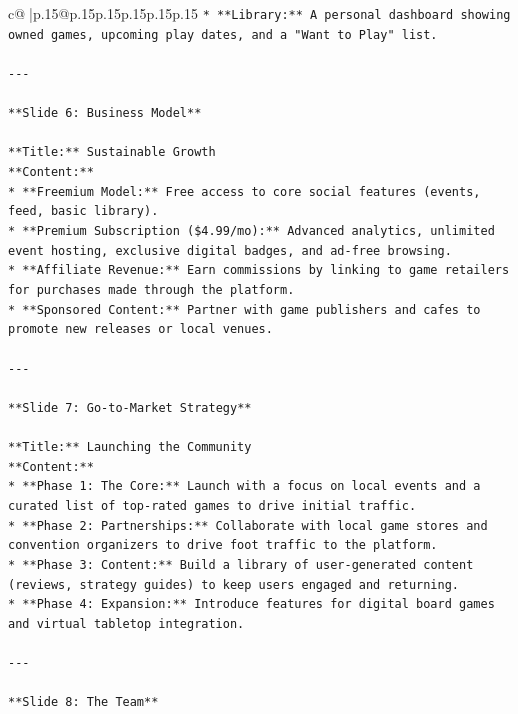 \documentclass{article}
\begin{document}
{\begin{supertabular}{c@{$\;$}|p{.15\linewidth}@{}p{.15\linewidth}p{.15\linewidth}p{.15\linewidth}p{.15\linewidth}p{.15\linewidth}}
{{{\texttt{*   **Library:** A personal dashboard showing owned games, upcoming play dates, and a "Want to Play" list.} \\
\\ 
\texttt{{-}{-}{-}} \\
\\ 
\texttt{**Slide 6: Business Model**} \\
\\ 
\texttt{**Title:** Sustainable Growth} \\
\texttt{**Content:**} \\
\texttt{*   **Freemium Model:** Free access to core social features (events, feed, basic library).} \\
\texttt{*   **Premium Subscription (\$4.99/mo):** Advanced analytics, unlimited event hosting, exclusive digital badges, and ad{-}free browsing.} \\
\texttt{*   **Affiliate Revenue:** Earn commissions by linking to game retailers for purchases made through the platform.} \\
\texttt{*   **Sponsored Content:** Partner with game publishers and cafes to promote new releases or local venues.} \\
\\ 
\texttt{{-}{-}{-}} \\
\\ 
\texttt{**Slide 7: Go{-}to{-}Market Strategy**} \\
\\ 
\texttt{**Title:** Launching the Community} \\
\texttt{**Content:**} \\
\texttt{*   **Phase 1: The Core:** Launch with a focus on local events and a curated list of top{-}rated games to drive initial traffic.} \\
\texttt{*   **Phase 2: Partnerships:** Collaborate with local game stores and convention organizers to drive foot traffic to the platform.} \\
\texttt{*   **Phase 3: Content:** Build a library of user{-}generated content (reviews, strategy guides) to keep users engaged and returning.} \\
\texttt{*   **Phase 4: Expansion:** Introduce features for digital board games and virtual tabletop integration.} \\
\\ 
\texttt{{-}{-}{-}} \\
\\ 
\texttt{**Slide 8: The Team**} \\
}}}
\end{supertabular}}
\end{document}
